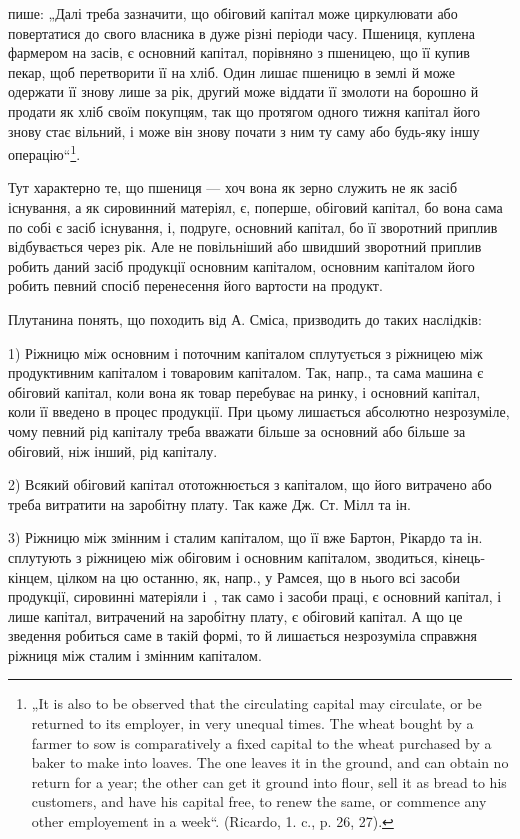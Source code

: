 \parcont{}  %
пише: „Далі треба зазначити, що обіговий капітал може циркулювати
або повертатися до свого власника в дуже різні періоди часу. Пшениця,
куплена фармером на засів, є основний капітал, порівняно з пшеницею,
що її купив пекар, щоб перетворити її на хліб. Один лишає пшеницю
в землі й може одержати її знову лише за рік, другий може віддати її
змолоти на борошно й продати як хліб своїм покупцям, так що протягом
одного тижня капітал його знову стає вільний, і може він знову почати
з ним ту саму або будь-яку іншу операцію“\footnote{
„It is also to be observed that the circulating capital may circulate, or be
returned to its employer, in very unequal times. The wheat bought by a farmer to
sow is comparatively a fixed capital to the wheat purchased by a baker to make
into loaves. The one leaves it in the ground, and can obtain no return for a year; the
other can get it ground into flour, sell it as bread to his customers, and have his capital
free, to renew the same, or commence any other employement in a week“. (Ricardo,
1. c., p. 26, 27).
}.

Тут характерно те, що пшениця — хоч вона як зерно служить не як
засіб існування, а як сировинний матеріял, є, поперше, обіговий капітал,
бо вона сама по собі є засіб існування, і, подруге, основний капітал, бо
її зворотний приплив відбувається через рік. Але не повільніший або
швидший зворотний приплив робить даний засіб продукції основним капіталом,
основним капіталом його робить певний спосіб перенесення його
вартости на продукт.

Плутанина понять, що походить від А. Сміса, призводить до таких
наслідків:

1) Ріжницю між основним і поточним капіталом сплутується з ріжницею
між продуктивним капіталом і товаровим капіталом. Так, напр.,
та сама машина є обіговий капітал, коли вона як товар перебуває на
ринку, і основний капітал, коли її введено в процес продукції. При
цьому лишається абсолютно незрозуміле, чому певний рід капіталу треба
вважати більше за основний або більше за обіговий, ніж інший, рід капіталу.

2) Всякий обіговий капітал ототожнюється з капіталом, що його витрачено
або треба витратити на заробітну плату. Так каже Дж. Ст. Мілл та ін.

3) Ріжницю між змінним і сталим капіталом, що її вже Бартон, Рікардо
та ін. сплутують з ріжницею між обіговим і основним капіталом, зводиться,
кінець-кінцем, цілком на цю останню, як, напр., у Рамсея, що в нього
всі засоби продукції, сировинні матеріяли і~, так само і засоби праці,
є основний капітал, і лише капітал, витрачений на заробітну плату, є
обіговий капітал. А що це зведення робиться саме в такій формі, то й
лишається незрозуміла справжня ріжниця між сталим і змінним капіталом.

